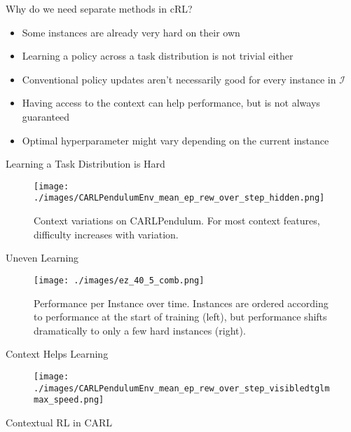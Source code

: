 \documentclass[aspectratio=169]{../latex_main/tntbeamer}  %
\begin{document}
\begin{frame}[c]{Why do we need separate methods in cRL?}

\begin{itemize}
	\item Some instances are already very hard on their own
	\item Learning a policy across a task distribution is not trivial either
	\item Conventional policy updates aren't necessarily good for every instance in $\mathcal{I}$
	\item Having access to the context can help performance, but is not always guaranteed
	\item Optimal hyperparameter might vary depending on the current instance
\end{itemize}


\end{frame}
\begin{frame}[c]{Learning a Task Distribution is Hard}
	
\begin{figure}
    \centering
    \texttt{[image: ./images/CARLPendulumEnv\_mean\_ep\_rew\_over\_step\_hidden.png]}
    \caption{Context variations on CARLPendulum. For most context features, difficulty increases with variation.}
    \label{fig:my_label}
\end{figure}
	
\end{frame}
\begin{frame}[c]{Uneven Learning}
	
\begin{figure}
    \centering
    \texttt{[image: ./images/ez\_40\_5\_comb.png]}
    \caption{Performance per Instance over time. Instances are ordered according to performance at the start of training (left), but performance shifts dramatically to only a few hard instances (right).}
    \label{fig:my_label}
\end{figure}
	
\end{frame}
\begin{frame}[c]{Context Helps Learning~}

\begin{figure}
    \centering
    \texttt{[image: ./images/CARLPendulumEnv\_mean\_ep\_rew\_over\_step\_visibledtglmmax\_speed.png]}
    
    \label{fig:my_label}
\end{figure}
\centering Contextual RL in CARL

\end{frame}
\end{document}
